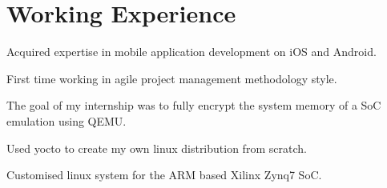 \documentclass[]{resume}
\begin{document}
\begin{minipage}[t]{0.66\textwidth} 	
\section{Working Experience}

	 
	\vspace{\topsep} %
	\begin{tightemize}
		
		\item Acquired expertise in mobile application development on iOS and Android. 
		\item First time working in agile project management methodology style. 
		
	\end{tightemize}
	\sectionsep


	 
	\begin{tightemize}
		
		\item The goal of my internship was to fully encrypt the system memory of a SoC emulation using QEMU.
		\item Used yocto to create my own linux distribution from scratch.
		\item Customised linux system for the ARM based Xilinx Zynq7 SoC. 

	\end{tightemize}
	\sectionsep

	 
	\begin{tightemize}
		

\end{tightemize}
\end{minipage}
\end{document}
